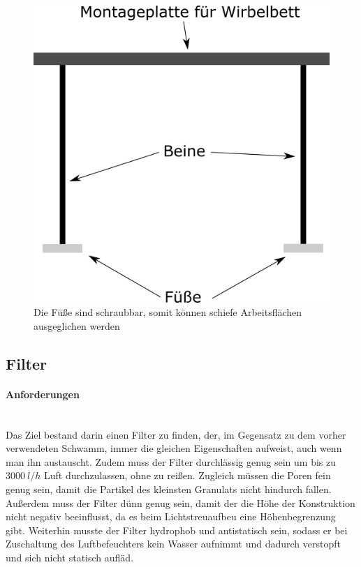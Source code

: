 \begin{figure}[h]
	\begin{center}
	\includegraphics[scale=0.6]{Halterung_Labor_Seite.png}
	\caption[Halterung Labor]{Die Füße sind schraubbar, somit können schiefe Arbeitsflächen ausgeglichen werden}
    \end{center}
\end{figure}


\subsection{Filter}

\paragraph{Anforderungen}
\hfill \\
Das Ziel bestand darin einen Filter zu finden, der, im Gegensatz zu dem vorher verwendeten Schwamm, immer die gleichen Eigenschaften aufweist, auch wenn man ihn austauscht. Zudem muss der Filter durchlässig genug sein um bis zu $\SI{3000}{l/h}$ Luft durchzulassen, ohne zu reißen. Zugleich müssen die Poren fein genug sein, damit die Partikel des kleinsten Granulats nicht hindurch fallen. Außerdem muss der Filter dünn genug sein, damit der die Höhe der Konstruktion nicht negativ beeinflusst, da es beim Lichtstreuaufbeu eine Höhenbegrenzung gibt. Weiterhin musste der Filter hydrophob und antistatisch sein, sodass er bei Zuschaltung des Luftbefeuchters kein Wasser aufnimmt und dadurch verstopft und sich nicht statisch aufläd.

